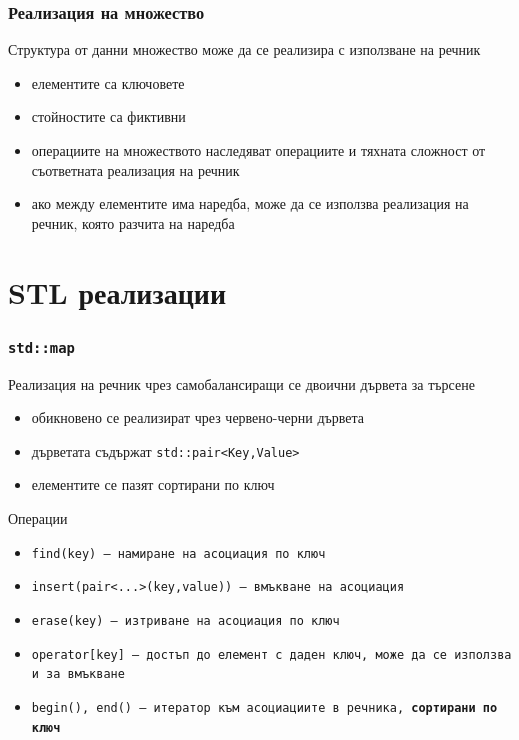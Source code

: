 \documentclass[alsotrans,beameroptions={aspectratio=169}]{beamerswitch}
\begin{document}
\begin{frame}
  \frametitle{Реализация на множество}
  Структура от данни множество може да се реализира с използване на речник
  \begin{itemize}
  \item елементите са ключовете
  \item стойностите са фиктивни
  \item операциите на множеството наследяват операциите и тяхната сложност от съответната реализация на речник
  \item ако между елементите има наредба, може да се използва реализация на речник, която разчита на наредба
  \end{itemize}
\end{frame}

\section{STL реализации}

\begin{frame}
  \frametitle{\tt{std::map}}
  Реализация на речник чрез самобалансиращи се двоични дървета за търсене
  \begin{itemize}
  \item обикновено се реализират чрез червено-черни дървета
  \item дърветата съдържат \tt{std::pair<Key,Value>}
  \item елементите се пазят сортирани по ключ
  \end{itemize}
  Операции
  \begin{itemize}
  \item \tt{find(key)} --- намиране на асоциация по ключ
  \item \tt{insert(pair<...>(key,value))} --- вмъкване на асоциация
  \item \tt{erase(key)} --- изтриване на асоциация по ключ
  \item \tt{operator[key]} --- достъп до елемент с даден ключ, може да се използва и за вмъкване
  \item \tt{begin(), end()} --- итератор към асоциациите в речника, \textbf{сортирани по ключ}
  \end{itemize}
\end{frame}
\end{document}
